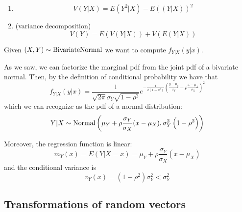 \documentclass[12pt]{extarticle}
\newcommand{\Normal}{{\operatorfont Normal}}
\newcommand{\BivariateNormal}{{\operatorfont BivariateNormal}}
\begin{document}
\begin{theorem}
    \skiplineafterproof
    \begin{enumerate}[label=\roman*.]
        \item \begin{equation}
                  V(Y|X) = E(Y^2 | X) - E\left((Y|X)\right)^2
              \end{equation}

        \item (variance decomposition)
              \begin{equation}
                  V(Y) = E(V(Y|X)) + V(E(Y|X))
              \end{equation}
    \end{enumerate}
\end{theorem}

\begin{example}
    Given $(X, Y) \sim \BivariateNormal$ we want to compute $f_{Y|X}(y|x)$.

    As we saw, we can factorize the marginal pdf from the joint pdf of a bivariate normal.
    Then, by the definition of conditional probability we have that
    \begin{equation}
        f_{Y|X}(y|x) = \frac{1}{\sqrt{2 \pi} \sigma_Y \sqrt{1-\rho^2}} e^{-\frac{1}{2(1-\rho^2)}\left( \frac{y-\mu_y}{\sigma_Y} - \rho \frac{x-\mu_X}{\sigma_X} \right)^2}
    \end{equation}
    which we can recognize as the pdf of a normal distribution:
    \begin{equation}
        Y|X \sim \Normal\left(\mu_Y + \rho\frac{\sigma_Y}{\sigma_X}(x - \mu_X), \sigma_Y^2\left(1-\rho^2\right)\right)
    \end{equation}

    Moreover, the regression function is linear:
    \begin{equation}
        m_Y(x) = E(Y|X = x) = \mu_Y + \rho \frac{\sigma_Y}{\sigma_X} (x - \mu_X)
    \end{equation}
    and the conditional variance is
    \begin{equation}
        v_Y(x) = \left(1- \rho^2\right) \sigma_Y^2 < \sigma_Y^2
    \end{equation}
\end{example}

\subsection{Transformations of random vectors}
\end{document}
